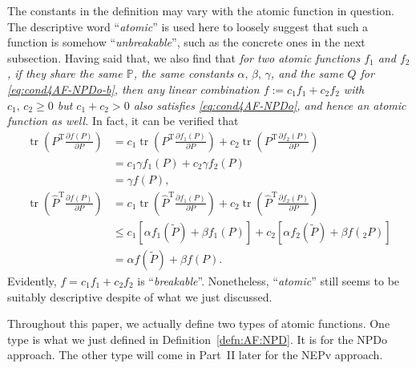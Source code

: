 \documentclass[11pt]{article}
\def\bbP{\mathbb{P}}
\def\wtd{\widetilde}
\def\what{\widehat}
\DeclareMathOperator{\tr}{tr}
\DeclareMathOperator{\T}{T}
\theoremstyle{definition}
\numberwithin{equation}{section}
\begin{document}
The constants in the definition may vary with the atomic function in question. The descriptive word ``{\em atomic\/}'' is
used here to loosely suggest that such a function is somehow ``{\em unbreakable\/}'', such as the concrete
ones in the next subsection. Having said that, we also find that
{\em for two atomic functions $f_1$ and $f_2$, if they
share the same $\bbP$, the same constants $\alpha,\,\beta,\,\gamma$, and the same $Q$ for \eqref{eq:cond4AF-NPDo-b},
then any linear combination $f:=c_1f_1+c_2f_2$ with $c_1,\,c_2\ge 0$ but $c_1+c_2>0$
also satisfies \eqref{eq:cond4AF-NPDo}, and hence an atomic function as well.}
In fact, it can be verified that
\begin{align*}
\tr\left(P^{\T}\frac{\partial f(P)}{\partial P}\right)
  &=c_1\tr\left(P^{\T}\frac{\partial f_1(P)}{\partial P}\right)+c_2\tr\left(P^{\T}\frac{\partial f_2(P)}{\partial P}\right) \\
  &=c_1\gamma f_1(P)+c_2\gamma f_2(P) \\
  &=\gamma f(P), \\
\tr\left(\what P^{\T}\frac{\partial f(P)}{\partial P}\right)
  &=c_1\tr\left(\what P^{\T}\frac{\partial f_1(P)}{\partial P}\right)+c_2\tr\left(\what P^{\T}\frac{\partial f_2(P)}{\partial P}\right) \\
  &\le c_1[\alpha f_1(\wtd P)+\beta f_1(P)]+c_2[\alpha f_2(\wtd P)+\beta f(_2P)] \\
  &=\alpha f(\wtd P)+\beta f(P).
\end{align*}
Evidently, $f=c_1f_1+c_2f_2$ is ``{\em breakable\/}''. Nonetheless,
``{\em atomic\/}'' still seems to be suitably descriptive despite of what we just discussed.

Throughout this paper, we actually define two types of atomic functions. One type is what we just defined
in Definition~\ref{defn:AF:NPD}. It is for the NPDo approach.
The other type will come in Part~II later for the NEPv approach.
\end{document}
